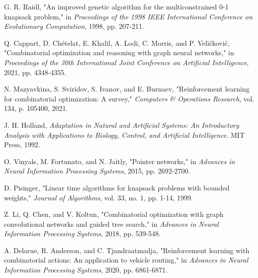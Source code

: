 \documentclass[conference, a4paper]{IEEEtran}
\begin{document}
\begin{thebibliography}{00}
 G. R. Raidl, "An improved genetic algorithm for the multiconstrained 0-1 knapsack problem," in \textit{Proceedings of the 1998 IEEE International Conference on Evolutionary Computation}, 1998, pp. 207-211.

 Q. Cappart, D. Chételat, E. Khalil, A. Lodi, C. Morris, and P. Veličković, "Combinatorial optimization and reasoning with graph neural networks," in \textit{Proceedings of the 30th International Joint Conference on Artificial Intelligence}, 2021, pp. 4348-4355.

 N. Mazyavkina, S. Sviridov, S. Ivanov, and E. Burnaev, "Reinforcement learning for combinatorial optimization: A survey," \textit{Computers & Operations Research}, vol. 134, p. 105400, 2021.

 J. H. Holland, \textit{Adaptation in Natural and Artificial Systems: An Introductory Analysis with Applications to Biology, Control, and Artificial Intelligence}. MIT Press, 1992.

 O. Vinyals, M. Fortunato, and N. Jaitly, "Pointer networks," in \textit{Advances in Neural Information Processing Systems}, 2015, pp. 2692-2700.

 D. Pisinger, "Linear time algorithms for knapsack problems with bounded weights," \textit{Journal of Algorithms}, vol. 33, no. 1, pp. 1-14, 1999.

 Z. Li, Q. Chen, and V. Koltun, "Combinatorial optimization with graph convolutional networks and guided tree search," in \textit{Advances in Neural Information Processing Systems}, 2018, pp. 539-548.

 A. Delarue, R. Anderson, and C. Tjandraatmadja, "Reinforcement learning with combinatorial actions: An application to vehicle routing," in \textit{Advances in Neural Information Processing Systems}, 2020, pp. 6861-6871.
\end{thebibliography}
\end{document}
